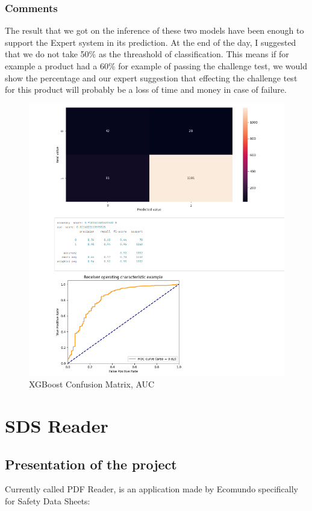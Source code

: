 \documentclass[a4paper,12pt,twoside]{report}
\begin{document}
\subsubsection{Comments}
The result that we got on the inference of these two models have been enough to support the Expert system in its prediction. At the end of the day, I suggested that we do not take 50\% as the threashold of classification. This means if for example a product had a 60\% for example of passing the challenge test, we would show the percentage and our expert suggestion that effecting the challenge test for this product will probably be a loss of time and money in case of failure.
\begin{figure}[H]
		\includegraphics[width=\textwidth]{images/xgboost}
	\caption[XGBoost Confusion Matrix, AUC]{XGBoost Confusion Matrix, AUC}
\label{xgboost}
\end{figure}
\section{SDS Reader}

\subsection{Presentation of the project}
Currently called PDF Reader, is an application made by Ecomundo specifically for Safety Data Sheets:
\end{document}
